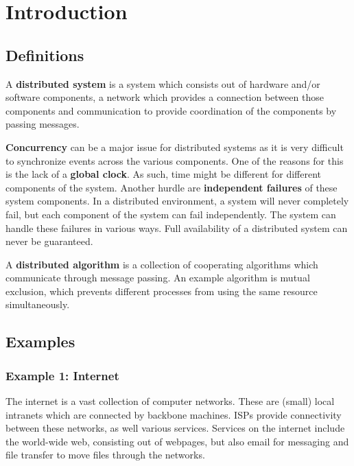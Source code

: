 \documentclass[a4paper]{article}
\begin{document}
\tableofcontents

\newpage

\section{Introduction}

\subsection{Definitions}

A \textbf{distributed system} is a system which consists out of hardware and/or software components, a network which provides a connection between those components and communication to provide coordination of the components by passing messages.

\textbf{Concurrency} can be a major issue for distributed systems as it is very difficult to synchronize events across the various components. One of the reasons for this is the lack of a \textbf{global clock}. As such, time might be different for different components of the system. Another hurdle are \textbf{independent failures} of these system components. In a distributed environment, a system will never completely fail, but each component of the system can fail independently. The system can handle these failures in various ways. Full availability of a distributed system can never be guaranteed.

A \textbf{distributed algorithm} is a collection of cooperating algorithms which communicate through message passing. An example algorithm is mutual exclusion, which prevents different processes from using the same resource simultaneously.

\subsection{Examples}

\subsubsection{Example 1: Internet}

The internet is a vast collection of computer networks. These are (small) local intranets which are connected by backbone machines. ISPs provide connectivity between these networks, as well various services. Services on the internet include the world-wide web, consisting out of webpages, but also email for messaging and file transfer to move files through the networks.
\end{document}
